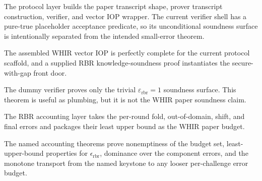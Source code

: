 \begin{definition}\label{def:whir_transcript_iop}
    The protocol layer builds the paper transcript shape, prover transcript construction,
    verifier, and vector IOP wrapper.  The current verifier shell has a pure-true placeholder
    acceptance predicate, so its unconditional soundness surface is intentionally separated from
    the intended small-error theorem.
\end{definition}

\begin{theorem}\label{thm:whir_protocol_completeness}
    The assembled WHIR vector IOP is perfectly complete for the current protocol scaffold, and
    a supplied RBR knowledge-soundness proof instantiates the secure-with-gap front door.
\end{theorem}

\begin{theorem}\label{thm:whir_dummy_soundness}
    The dummy verifier proves only the trivial $\varepsilon_{\mathrm{rbr}}=1$ soundness
    surface.  This theorem is useful as plumbing, but it is not the WHIR paper soundness claim.
\end{theorem}

\begin{definition}\label{def:whir_rbr_budget}
    The RBR accounting layer takes the per-round fold, out-of-domain, shift, and final errors
    and packages their least upper bound as the WHIR paper budget.
\end{definition}

\begin{theorem}\label{thm:whir_rbr_budget_accounting}
    The named accounting theorems prove nonemptiness of the budget set, least-upper-bound
    properties for $\epsilon_{\mathrm{rbr}}$, dominance over the component errors, and the
    monotone transport from the named keystone to any looser per-challenge error budget.
\end{theorem}

